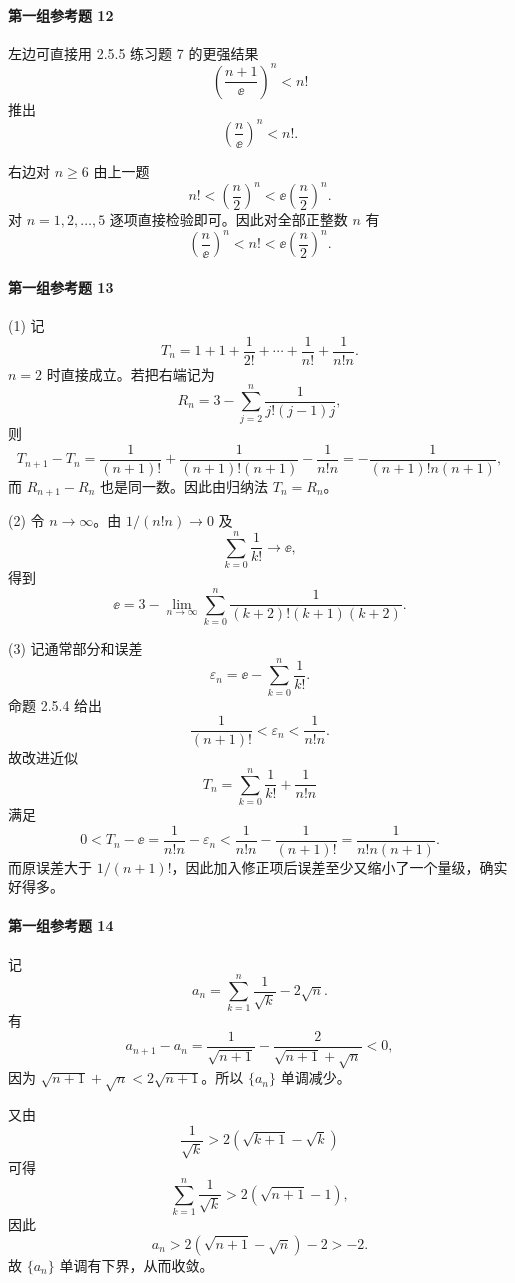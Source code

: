 \paragraph{第一组参考题 12}
\begin{xsolution}
左边可直接用 2.5.5 练习题 7 的更强结果
\[
  \left(\frac{n+1}{\ee}\right)^n<n!
\]
推出
\[
  \left(\frac n\ee\right)^n<n!.
\]

右边对 $n\ge6$ 由上一题
\[
  n!<\left(\frac n2\right)^n<\ee\left(\frac n2\right)^n.
\]
对 $n=1,2,\ldots,5$ 逐项直接检验即可。因此对全部正整数 $n$ 有
\[
  \boxed{\left(\frac n\ee\right)^n<n!<\ee\left(\frac n2\right)^n}.
\]
\end{xsolution}

\paragraph{第一组参考题 13}
\begin{xsolution}
(1) 记
\[
  T_n=1+1+\frac1{2!}+\cdots+\frac1{n!}+\frac1{n!n}.
\]
$n=2$ 时直接成立。若把右端记为
\[
  R_n=3-\sum_{j=2}^n\frac1{j!(j-1)j},
\]
则
\[
  T_{n+1}-T_n
  =\frac1{(n+1)!}+\frac1{(n+1)!(n+1)}-\frac1{n!n}
  =-\frac1{(n+1)!n(n+1)},
\]
而 $R_{n+1}-R_n$ 也是同一数。因此由归纳法 $T_n=R_n$。

(2) 令 $n\to\infty$。由 $1/(n!n)\to0$ 及
\[
  \sum_{k=0}^n\frac1{k!}\to\ee,
\]
得到
\[
  \boxed{\ee=3-\lim_{n\to\infty}
  \sum_{k=0}^n\frac1{(k+2)!(k+1)(k+2)}}.
\]

(3) 记通常部分和误差
\[
  \varepsilon_n=\ee-\sum_{k=0}^n\frac1{k!}.
\]
命题 2.5.4 给出
\[
  \frac1{(n+1)!}<\varepsilon_n<\frac1{n!n}.
\]
故改进近似
\[
  T_n=\sum_{k=0}^n\frac1{k!}+\frac1{n!n}
\]
满足
\[
  0<T_n-\ee
  =\frac1{n!n}-\varepsilon_n
  <\frac1{n!n}-\frac1{(n+1)!}
  =\frac1{n!n(n+1)}.
\]
而原误差大于 $1/(n+1)!$，因此加入修正项后误差至少又缩小了一个量级，确实好得多。
\end{xsolution}

\paragraph{第一组参考题 14}
\begin{xsolution}
记
\[
  a_n=\sum_{k=1}^n\frac1{\sqrt k}-2\sqrt n.
\]
有
\[
  a_{n+1}-a_n
  =\frac1{\sqrt{n+1}}-\frac{2}{\sqrt{n+1}+\sqrt n}<0,
\]
因为 $\sqrt{n+1}+\sqrt n<2\sqrt{n+1}$。所以 $\{a_n\}$ 单调减少。

又由
\[
  \frac1{\sqrt k}>2(\sqrt{k+1}-\sqrt k)
\]
可得
\[
  \sum_{k=1}^n\frac1{\sqrt k}>2(\sqrt{n+1}-1),
\]
因此
\[
  a_n>2(\sqrt{n+1}-\sqrt n)-2>-2.
\]
故 $\{a_n\}$ 单调有下界，从而收敛。
\end{xsolution}

